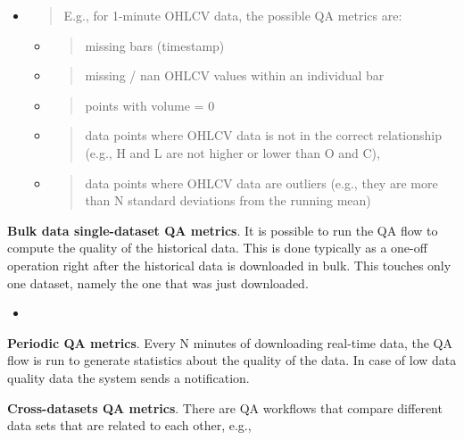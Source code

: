 \documentclass[11pt, reqno]{amsart}
\begin{document}
\begin{itemize}
\item
  \begin{quote}
  E.g., for 1-minute OHLCV data, the possible QA metrics are:
  \end{quote}

  \begin{itemize}
  \item
    \begin{quote}
    missing bars (timestamp)
    \end{quote}
  \item
    \begin{quote}
    missing / nan OHLCV values within an individual bar
    \end{quote}
  \item
    \begin{quote}
    points with volume = 0
    \end{quote}
  \item
    \begin{quote}
    data points where OHLCV data is not in the correct relationship
    (e.g., H and L are not higher or lower than O and C),
    \end{quote}
  \item
    \begin{quote}
    data points where OHLCV data are outliers (e.g., they are more than
    N standard deviations from the running mean)
    \end{quote}
  \end{itemize}
\end{itemize}

\textbf{Bulk data single-dataset QA metrics}. It is possible to run the
QA flow to compute the quality of the historical data. This is done
typically as a one-off operation right after the historical data is
downloaded in bulk. This touches only one dataset, namely the one that
was just downloaded.

\begin{itemize}
\tightlist
\item
\end{itemize}

\textbf{Periodic QA metrics}. Every N minutes of downloading real-time
data, the QA flow is run to generate statistics about the quality of the
data. In case of low data quality data the system sends a notification.

\textbf{Cross-datasets QA metrics}. There are QA workflows that compare
different data sets that are related to each other, e.g.,
\end{document}
